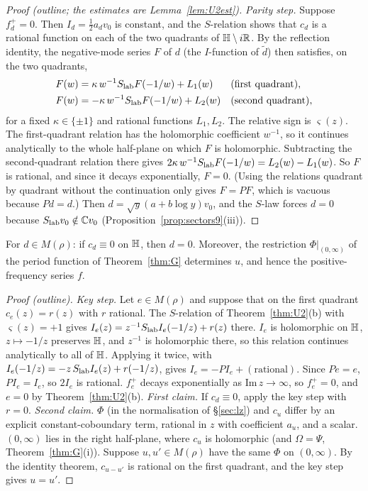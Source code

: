 \begin{proof}[Proof (outline; the estimates are Lemma~\ref{lem:U2est})]
\emph{Parity step.} Suppose $f_d^+=0$. Then $I_d=\tfrac12a_dv_0$ is constant, and the $S$-relation shows that $c_d$ is a rational function on each of the two quadrants of $\mathbb{H}\setminus i\mathbb{R}$. By the reflection identity, the negative-mode series $F$ of $d$ (the $I$-function of $\tilde d$) then satisfies, on the two quadrants,
\begin{align*}
F(w)&=\kappa\,w^{-1}S_{\rm lab}F(-1/w)+L_1(w)&&(\text{first quadrant}),\\
F(w)&=-\kappa\,w^{-1}S_{\rm lab}F(-1/w)+L_2(w)&&(\text{second quadrant}),
\end{align*}
for a fixed $\kappa\in\{\pm1\}$ and rational functions $L_1,L_2$. The relative sign is $\varsigma(z)$. The first-quadrant relation has the holomorphic coefficient $w^{-1}$, so it continues analytically to the whole half-plane on which $F$ is holomorphic. Subtracting the second-quadrant relation there gives $2\kappa\,w^{-1}S_{\rm lab}F(-1/w)=L_2(w)-L_1(w)$. So $F$ is rational, and since it decays exponentially, $F=0$. (Using the relations quadrant by quadrant without the continuation only gives $F=PF$, which is vacuous because $Pd=d$.) Then $d=\sqrt y(a+b\log y)v_0$, and the $S$-law forces $d=0$ because $S_{\rm lab}v_0\notin\mathbb{C} v_0$ (Proposition~\ref{prop:sectors9}(iii)).
\end{proof}

\begin{corollary}\label{cor:U3}
For $d\in M(\rho)$: if $c_d\equiv0$ on $\mathbb{H}$, then $d=0$. Moreover, the restriction $\Phi|_{(0,\infty)}$ of the period function of Theorem~\ref{thm:G} determines $u$, and hence the positive-frequency series $f$.
\end{corollary}
\begin{proof}[Proof (outline)]
\emph{Key step.} Let $e\in M(\rho)$ and suppose that on the first quadrant $c_e(z)=r(z)$ with $r$ rational. The $S$-relation of Theorem~\ref{thm:U2}(b) with $\varsigma(z)=+1$ gives $I_e(z)=z^{-1}S_{\rm lab}I_e(-1/z)+r(z)$ there. $I_e$ is holomorphic on $\mathbb{H}$, $z\mapsto-1/z$ preserves $\mathbb{H}$, and $z^{-1}$ is holomorphic there, so this relation continues analytically to all of $\mathbb{H}$. Applying it twice, with $I_e(-1/z)=-z\,S_{\rm lab}I_e(z)+r(-1/z)$, gives $I_e=-PI_e+(\text{rational})$. Since $Pe=e$, $PI_e=I_e$, so $2I_e$ is rational. $f_e^+$ decays exponentially as $\mathrm{Im}\,z\to\infty$, so $f_e^+=0$, and $e=0$ by Theorem~\ref{thm:U2}(b).
\emph{First claim.} If $c_d\equiv0$, apply the key step with $r=0$.
\emph{Second claim.} $\Phi$ (in the normalisation of \S\ref{sec:lz}) and $c_u$ differ by an explicit constant-coboundary term, rational in $z$ with coefficient $a_u$, and a scalar. $(0,\infty)$ lies in the right half-plane, where $c_u$ is holomorphic (and $\Omega=\Psi$, Theorem~\ref{thm:G}(i)). Suppose $u,u'\in M(\rho)$ have the same $\Phi$ on $(0,\infty)$. By the identity theorem, $c_{u-u'}$ is rational on the first quadrant, and the key step gives $u=u'$.
\end{proof}

